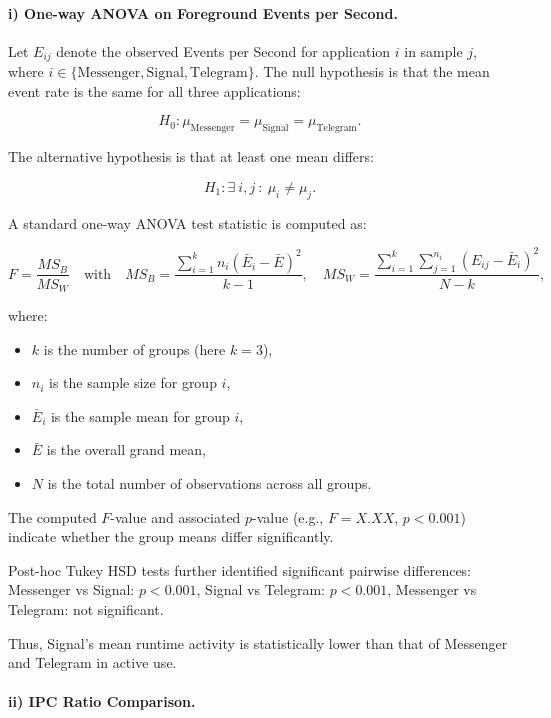 \documentclass[a4paper,12pt]{report}
\begin{document}
\paragraph{i) One-way ANOVA on Foreground Events per Second.}

Let $E_{ij}$ denote the observed Events per Second for application $i$ in sample $j$, where $i \in \{\text{Messenger}, \text{Signal}, \text{Telegram}\}$.
The null hypothesis is that the mean event rate is the same for all three applications:

\[
H_0 : \mu_{\text{Messenger}} = \mu_{\text{Signal}} = \mu_{\text{Telegram}}.
\]

The alternative hypothesis is that at least one mean differs:

\[
H_1 : \exists~i,j~:~\mu_i \ne \mu_j.
\]

A standard one-way ANOVA test statistic is computed as:

\[
F = \frac{MS_B}{MS_W}
\quad \text{with} \quad
MS_B = \frac{\sum_{i=1}^k n_i (\bar{E}_i - \bar{E})^2}{k - 1},
\quad
MS_W = \frac{\sum_{i=1}^k \sum_{j=1}^{n_i} (E_{ij} - \bar{E}_i)^2}{N - k},
\]


\noindent
where:
\begin{itemize}
    \item $k$ is the number of groups (here $k = 3$),
    \item $n_i$ is the sample size for group $i$,
    \item $\bar{E}_i$ is the sample mean for group $i$,
    \item $\bar{E}$ is the overall grand mean,
    \item $N$ is the total number of observations across all groups.
\end{itemize}

The computed $F$-value and associated $p$-value (e.g., $F = X.XX$, $p < 0.001$) indicate whether the group means differ significantly.

Post-hoc Tukey HSD tests further identified significant pairwise differences:
Messenger vs Signal: $p < 0.001$,
Signal vs Telegram: $p < 0.001$,
Messenger vs Telegram: not significant.

Thus, Signal’s mean runtime activity is statistically lower than that of Messenger and Telegram in active use.

\paragraph{ii) IPC Ratio Comparison.}
\end{document}

